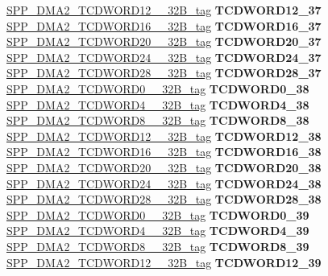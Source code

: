 \begin{DoxyCompactItemize}
\begin{tabbing}
\>\>\mbox{\hyperlink{unionSPP__DMA2__TCDWORD12____32B__tag}{SPP\_DMA2\_TCDWORD12\_\_32B\_tag}} {\bfseries TCDWORD12\_37}\\
\>\>\mbox{\hyperlink{unionSPP__DMA2__TCDWORD16____32B__tag}{SPP\_DMA2\_TCDWORD16\_\_32B\_tag}} {\bfseries TCDWORD16\_37}\\
\>\>\mbox{\hyperlink{unionSPP__DMA2__TCDWORD20____32B__tag}{SPP\_DMA2\_TCDWORD20\_\_32B\_tag}} {\bfseries TCDWORD20\_37}\\
\>\>\mbox{\hyperlink{unionSPP__DMA2__TCDWORD24____32B__tag}{SPP\_DMA2\_TCDWORD24\_\_32B\_tag}} {\bfseries TCDWORD24\_37}\\
\>\>\mbox{\hyperlink{unionSPP__DMA2__TCDWORD28____32B__tag}{SPP\_DMA2\_TCDWORD28\_\_32B\_tag}} {\bfseries TCDWORD28\_37}\\
\>\>\mbox{\hyperlink{unionSPP__DMA2__TCDWORD0____32B__tag}{SPP\_DMA2\_TCDWORD0\_\_32B\_tag}} {\bfseries TCDWORD0\_38}\\
\>\>\mbox{\hyperlink{unionSPP__DMA2__TCDWORD4____32B__tag}{SPP\_DMA2\_TCDWORD4\_\_32B\_tag}} {\bfseries TCDWORD4\_38}\\
\>\>\mbox{\hyperlink{unionSPP__DMA2__TCDWORD8____32B__tag}{SPP\_DMA2\_TCDWORD8\_\_32B\_tag}} {\bfseries TCDWORD8\_38}\\
\>\>\mbox{\hyperlink{unionSPP__DMA2__TCDWORD12____32B__tag}{SPP\_DMA2\_TCDWORD12\_\_32B\_tag}} {\bfseries TCDWORD12\_38}\\
\>\>\mbox{\hyperlink{unionSPP__DMA2__TCDWORD16____32B__tag}{SPP\_DMA2\_TCDWORD16\_\_32B\_tag}} {\bfseries TCDWORD16\_38}\\
\>\>\mbox{\hyperlink{unionSPP__DMA2__TCDWORD20____32B__tag}{SPP\_DMA2\_TCDWORD20\_\_32B\_tag}} {\bfseries TCDWORD20\_38}\\
\>\>\mbox{\hyperlink{unionSPP__DMA2__TCDWORD24____32B__tag}{SPP\_DMA2\_TCDWORD24\_\_32B\_tag}} {\bfseries TCDWORD24\_38}\\
\>\>\mbox{\hyperlink{unionSPP__DMA2__TCDWORD28____32B__tag}{SPP\_DMA2\_TCDWORD28\_\_32B\_tag}} {\bfseries TCDWORD28\_38}\\
\>\>\mbox{\hyperlink{unionSPP__DMA2__TCDWORD0____32B__tag}{SPP\_DMA2\_TCDWORD0\_\_32B\_tag}} {\bfseries TCDWORD0\_39}\\
\>\>\mbox{\hyperlink{unionSPP__DMA2__TCDWORD4____32B__tag}{SPP\_DMA2\_TCDWORD4\_\_32B\_tag}} {\bfseries TCDWORD4\_39}\\
\>\>\mbox{\hyperlink{unionSPP__DMA2__TCDWORD8____32B__tag}{SPP\_DMA2\_TCDWORD8\_\_32B\_tag}} {\bfseries TCDWORD8\_39}\\
\>\>\mbox{\hyperlink{unionSPP__DMA2__TCDWORD12____32B__tag}{SPP\_DMA2\_TCDWORD12\_\_32B\_tag}} {\bfseries TCDWORD12\_39}\\

\end{tabbing}
\end{DoxyCompactItemize}
